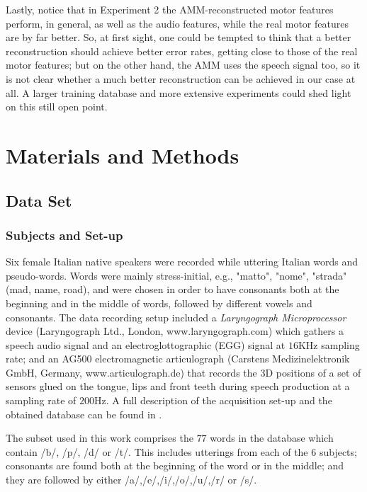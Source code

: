 \documentclass[10pt]{article}
\begin{document}
Lastly, notice that in Experiment 2 the AMM-reconstructed motor features perform, in general,
as well as the audio features, while the real motor features are by far better. So, at first
sight, one could be tempted to think that a better reconstruction should achieve better error
rates, getting close to those of the real motor features;
but on the other hand, the AMM uses the speech signal too, so it is not clear
whether a much better reconstruction can be achieved in our case at all. A larger training
database and more extensive experiments could shed light on this still open point.


\section*{Materials and Methods}\label{sec:methods}

\subsection*{Data Set}
\label{sec:dataset}

\subsubsection*{Subjects and Set-up}
\label{subsec:setup}

Six female Italian native speakers were recorded while uttering
Italian words and pseudo-words. Words were mainly stress-initial, e.g.,
"matto", "nome", "strada" (mad, name, road), and were chosen in order
to have consonants both at the beginning and in the middle of
words, followed by different vowels and consonants.
The data recording setup included a \emph{Laryngograph Microprocessor}
device (Laryngograph Ltd., London, www.laryngograph.com) which gathers a speech audio
signal and an electroglottographic (EGG) signal at $16$KHz sampling
rate; and an AG500 electromagnetic articulograph (Carstens Medizinelektronik
GmbH, Germany, www.articulograph.de) that records the
3D positions of a set of sensors glued on the tongue, lips and front teeth
during speech production at a sampling rate of $200$Hz. A full description of the 
acquisition set-up and the obtained database can be found in \cite{tavella}.

The subset used in this work comprises the $77$ words in the database
which contain /b/, /p/, /d/ or /t/. This includes utterings from each of the
$6$ subjects; consonants are found both at the beginning of the word or
in the middle; and they are followed by either /a/,/e/,/i/,/o/,/u/,/r/ or /s/.
\end{document}
